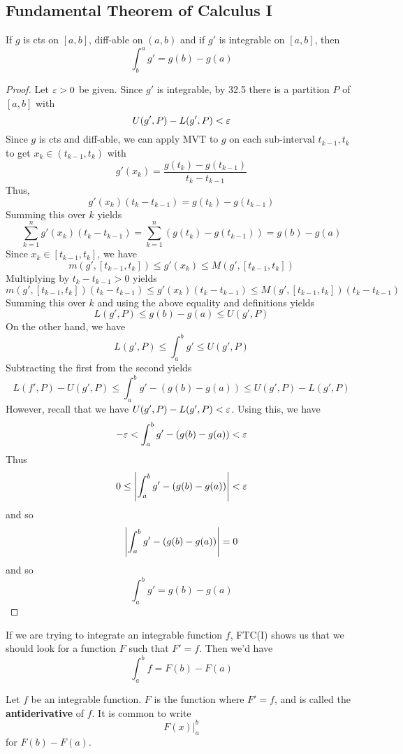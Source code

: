 \documentclass{article}
\begin{document}
  \subsection{Fundamental Theorem of Calculus I}
  \begin{cthm}[FTC I]
    If $g$ is cts on $[a, b]$, diff-able on $(a, b)$ and if $g'$ is integrable on $[a, b]$, then \[
      \int_b^a g' = g(b) - g(a)
    \]
  \end{cthm}
  \begin{proof}
    Let $\varepsilon > 0$ be given. Since $g'$ is integrable, by 32.5 there is a partition $P$ of $[a, b]$ with \[
      U(g', P) - L(g', P) < \varepsilon
    \]
    Since $g$ is cts and diff-able, we can apply MVT to $g$ on each sub-interval ${t_{k-1}, t_k}$ to get $x_k \in (t_{k-1}, t_k)$ with \[
      g'(x_k) = \frac{g(t_k) - g(t_{k-1})}{t_k - t_{k-1}}
    \]
    Thus, \[
      g'(x_k)(t_k - t_{k-1}) = g(t_k) - g(t_{k-1})
    \]
    Summing this over $k$ yields \[
      \sum_{k=1}^n g'(x_k)(t_k - t_{k-1}) = \sum_{k=1}^n (g(t_k) - g(t_{k-1})) = g(b) - g(a)
    \]
    Since $x_k \in [t_{k-1}, t_k]$, we have \[
      m(g', [t_{k-1}, t_k]) \leq g'(x_k) \leq M(g', [t_{k-1}, t_k])
    \]
    Multiplying by $t_k - t_{k-1} > 0$ yields
    \[
      m(g', [t_{k-1}, t_k])(t_k - t_{k-1}) \leq g'(x_k)(t_k - t_{k-1}) \leq M(g', [t_{k-1}, t_k])(t_k - t_{k-1})
    \]
    Summing this over $k$ and using the above equality and definitions yields \[
      L(g', P) \leq g(b) - g(a) \leq U(g', P)
    \]
    On the other hand, we have \[
      L(g', P) \leq \int_a^b g' \leq U(g', P)
    \]
    Subtracting the first from the second yields \[
      L(f', P) - U(g', P) \leq \int_a^b g' - (g(b) - g(a)) \leq U(g', P) - L(g', P)
    \]
    However, recall that we have $U(g', P) - L(g', P) < \varepsilon$. Using this, we have \[
      -\varepsilon < \int_a^b g' - (g(b) - g(a)) < \varepsilon
    \]
    Thus \[
      0 \leq \abs{\int_a^b g' - (g(b) - g(a))} < \varepsilon
    \]
    and so \[
      \abs{\int_a^b g' - (g(b) - g(a))} = 0
    \] and so \[
      \int_a^b g' = g(b) - g(a)
    \]
  \end{proof}
  \begin{remark}
    If we are trying to integrate an integrable function $f$, FTC(I) shows us that we should look for a function $F$ such that $F' = f$. Then we'd have \[
      \int_a^b f = F(b) - F(a)
    \]
  \end{remark}
  \begin{definition}
    Let $f$ be an integrable function. $F$ is the function where $F' = f$, and is called the \textbf{antiderivative} of $f$. It is common to write \[
      F(x)\Big|_a^b
    \] for $F(b) - F(a)$.
  \end{definition}
\end{document}
